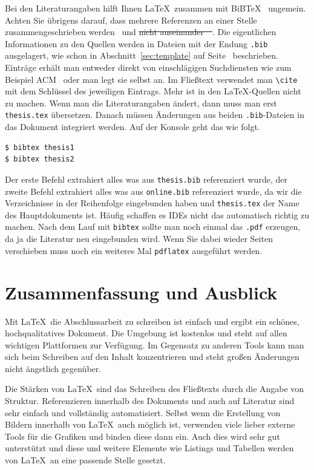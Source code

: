 \documentclass[11pt,a4paper]{report}
\begin{document}
Bei den Literaturangaben hilft Ihnen \LaTeX\ zusammen mit
BiBTeX~\cite{bibtexing,kopka} ungemein.
Achten Sie übrigens darauf, dass mehrere Referenzen 
an einer Stelle zusammengeschrieben werden~\cite{bibtexing,kopka}
und \st{nicht auseinander~\mbox{\cite{bibtexing}}\mbox{~\cite{kopka}}}.
Die eigentlichen Informationen zu den Quellen werden 
in Dateien mit der Endung \verb|.bib| ausgelagert,
wie schon in Abschnitt~\ref{sec:template} 
auf Seite~\pageref{page:bib} beschrieben.
Einträge erhält man entweder direkt von einschlägigen
Suchdiensten wie zum Beispiel ACM~\cite{acm} oder
man legt sie selbst an.
Im Fließtext verwendet man \verb|\cite| mit dem Schlüssel
des jeweiligen Eintrags. 
Mehr ist in den \LaTeX-Quellen nicht zu machen. 
Wenn man die Literaturangaben ändert, dann muss
man erst \verb|thesis.tex| übersetzen.
Danach müssen Änderungen aus beiden \verb|.bib|-Dateien 
in das Dokument integriert werden. 
Auf der Konsole geht das wie folgt.
\begin{verbatim}
$ bibtex thesis1
$ bibtex thesis2
\end{verbatim}
Der erste Befehl extrahiert alles was aus \verb|thesis.bib|
referenziert wurde, der zweite Befehl extrahiert alles was aus 
\verb|online.bib| referenziert wurde, 
da wir die Verzeichnisse in der Reihenfolge eingebunden haben 
und \verb|thesis.tex| der Name des Hauptdokuments ist.
Häufig schaffen es IDEs nicht das automatisch richtig zu machen. 
Nach dem Lauf mit \verb|bibtex| sollte man noch einmal 
das \verb|.pdf| erzeugen, da ja die Literatur neu eingebunden
wird. Wenn Sie dabei wieder Seiten verschieben muss noch 
ein weiteres Mal \verb|pdflatex| ausgeführt werden. 


\chapter{Zusammenfassung und Ausblick} \label{chap:fazit}

Mit \LaTeX\ die Abschlussarbeit zu schreiben ist 
einfach und ergibt ein schönes, hochqualitatives Dokument.
Die Umgebung ist kostenlos und steht auf allen wichtigen
Plattformen zur Verfügung.
Im Gegensatz zu anderen Tools kann man sich beim Schreiben 
auf den Inhalt konzentrieren und steht großen Änderungen 
nicht ängstlich gegenüber.

Die Stärken von \LaTeX\ sind das Schreiben des Fließtexts
durch die Angabe von Struktur. 
Referenzieren innerhalb des Dokuments und auch auf 
Literatur sind sehr einfach und vollständig automatisiert. 
Selbst wenn die Erstellung von Bildern innerhalb von
\LaTeX\ auch möglich ist, verwenden viele lieber externe 
Tools für die Grafiken und binden diese dann ein. 
Auch dies wird sehr gut unterstützt und diese und
weitere Elemente wie Listings und Tabellen werden
von \LaTeX\ an eine passende Stelle gesetzt.
\end{document}
